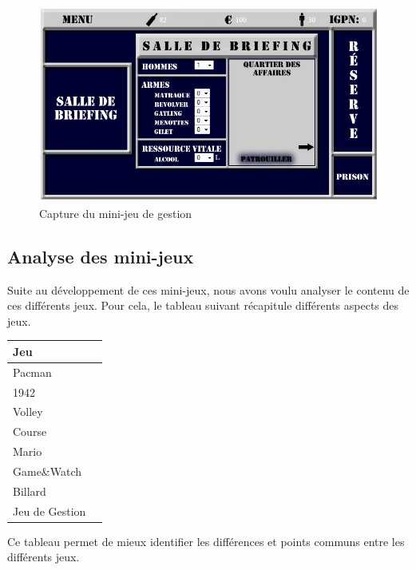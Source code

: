 \begin{figure}
 \includegraphics[width=\linewidth]{img/capturejeu_gestion2}
 \caption{Capture du mini-jeu de gestion}
 \label{fig:game_gestion}
\end{figure}

\subsection{Analyse des mini-jeux}

Suite au développement de ces mini-jeux, nous avons voulu analyser le contenu de ces différents jeux.
Pour cela, le tableau suivant récapitule différents aspects des jeux.


\vspace{0.5cm}

\begin{tabular}{|l|l}
\hline
 Jeu &   \\
\hline
 Pacman &  \\
\hline
 1942 &   \\
\hline
 Volley &  \\
\hline
 Course &  \\
\hline
 Mario &  \\
\hline
 Game\&Watch & \\
\hline
 Billard &  \\
\hline
 Jeu de Gestion & \\
\hline
\end{tabular}

\vspace{0.5cm}

Ce tableau permet de mieux identifier les différences et points communs entre les différents jeux.

